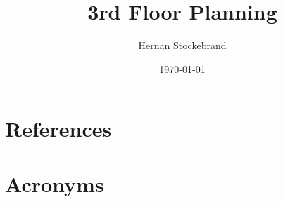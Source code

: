 \documentclass[PMO,authoryear,toc]{lsstdoc}
\title{3rd Floor Planning}
\author{%
Hernan Stockebrand
}
\date{\today}
\begin{document}
\maketitle


\appendix
\section{References} \label{sec:bib}
\renewcommand{\refname}{} %


\section{Acronyms} \label{sec:acronyms}

\end{document}
